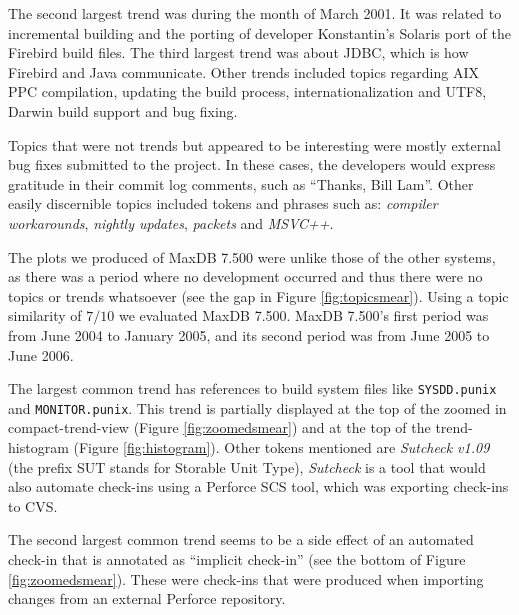 \documentclass[times, 10pt,twocolumn]{article}
\newcommand{\shrinkit}{\vspace*{-.3em}}
\begin{document}
The second largest trend was during the month of March 2001. It was
related to incremental building and the porting of developer
Konstantin's Solaris port of the Firebird build files. The third
largest trend was about JDBC, which is how Firebird and Java
communicate.  Other trends included topics regarding AIX PPC
compilation, updating the build process, internationalization and
UTF8, Darwin build support and bug fixing.

Topics that were not trends but appeared to be interesting were mostly
external bug fixes submitted to the project.  In these cases, the
developers would express gratitude in their commit log comments, such
as ``Thanks, Bill Lam''.  Other easily discernible topics included
tokens and phrases such as: \emph{compiler workarounds}, \emph{nightly
  updates}, \emph{packets} and \emph{MSVC++}.


\shrinkit
{}
\shrinkit






The plots we produced of MaxDB 7.500 were unlike those of the other
systems, as there was a period where no development occurred and
thus there were no topics or trends whatsoever (see the gap in Figure
\ref{fig:topicsmear}). Using a topic similarity of $7/10$ we evaluated
MaxDB 7.500. MaxDB 7.500's first period was from June 2004 to January
2005, and its second period was from June 2005 to June 2006.

The largest common trend has references to build system files like
\texttt{SYSDD.punix} and \texttt{MONITOR.punix}.  This trend is
partially displayed at the top of the zoomed in compact-trend-view
(Figure \ref{fig:zoomedsmear}) and at the top of the trend-histogram
(Figure \ref{fig:histogram}).  Other tokens mentioned are
\emph{Sutcheck v1.09} (the prefix SUT stands for Storable Unit Type),
\emph{Sutcheck} is a tool that would also automate check-ins using a Perforce SCS
tool, which was exporting check-ins to CVS.

The second largest common trend seems to be a side effect of an
automated check-in that is annotated as ``implicit check-in'' (see
the bottom of Figure \ref{fig:zoomedsmear}). These were check-ins that
were produced when importing changes from an external Perforce
repository.
\end{document}
